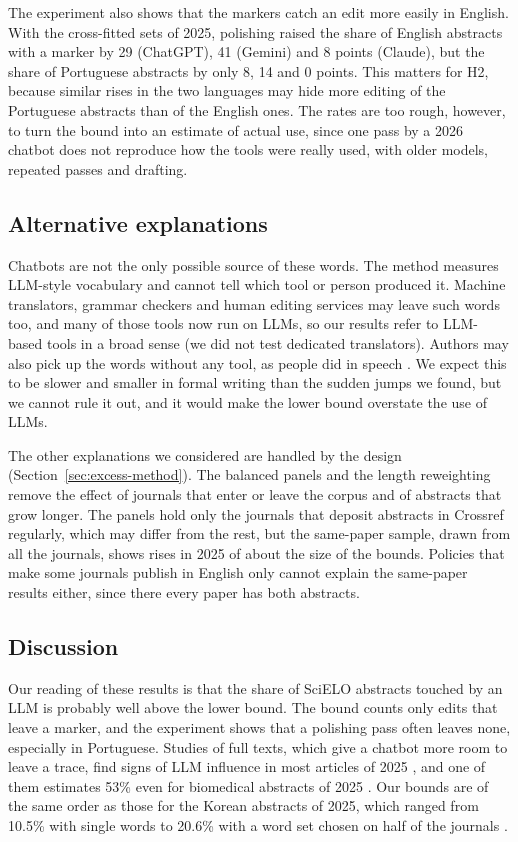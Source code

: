 \documentclass[12pt]{article}
\begin{document}
The experiment also shows that the markers catch an edit more easily in English. With the
cross-fitted sets of 2025, polishing raised the share of English abstracts with a marker by 29
(ChatGPT), 41 (Gemini) and 8 points (Claude), but the share of Portuguese abstracts by only 8, 14
and 0 points. This matters for H2, because similar rises in the two languages may hide more editing
of the Portuguese abstracts than of the English ones. The rates are too rough, however, to turn the
bound into an estimate of actual use, since one pass by a 2026 chatbot does not reproduce how the
tools were really used, with older models, repeated passes and drafting.

\subsection{Alternative explanations}
\label{sec:alternatives}

Chatbots are not the only possible source of these words. The method measures LLM-style vocabulary
and cannot tell which tool or person produced it. Machine translators, grammar checkers and human
editing services may leave such words too, and many of those tools now run on LLMs, so our results
refer to LLM-based tools in a broad sense (we did not test dedicated translators). Authors may also
pick up the words without any tool, as people did in speech \cite{yakura2024empirical}. We expect
this to be slower and smaller in formal writing than the sudden jumps we found, but we cannot rule
it out, and it would make the lower bound overstate the use of LLMs.

The other explanations we considered are handled by the design (Section~\ref{sec:excess-method}).
The balanced panels and the length reweighting remove the effect of journals that enter or leave
the corpus and of abstracts that grow longer. The panels hold only the journals that deposit
abstracts in Crossref regularly, which may differ from the rest, but the same-paper sample, drawn
from all the journals, shows rises in 2025 of about the size of the bounds. Policies that make some
journals publish in English only cannot explain the same-paper results either, since there every
paper has both abstracts.

\subsection{Discussion}
\label{sec:discussion}

Our reading of these results is that the share of SciELO abstracts touched by an LLM is probably
well above the lower bound. The bound counts only edits that leave a marker, and the experiment
shows that a polishing pass often leaves none, especially in Portuguese. Studies of full texts,
which give a chatbot more room to leave a trace, find signs of LLM influence in most articles of
2025 \cite{siler2026diffusion,holzwarth2026most}, and one of them estimates 53\% even for biomedical
abstracts of 2025 \cite{holzwarth2026most}. Our bounds are of the same order as those for the
Korean abstracts of 2025, which ranged from 10.5\% with single words to 20.6\% with a word set
chosen on half of the journals \cite{lee2026korean}.
\end{document}
